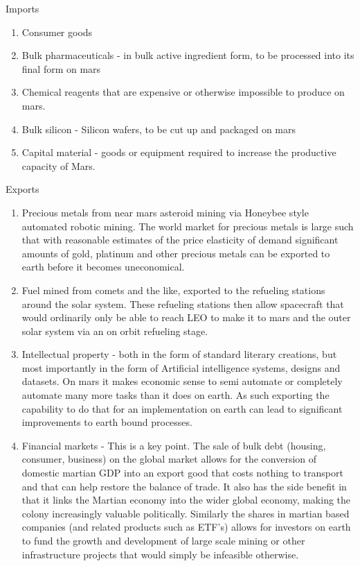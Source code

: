 \documentclass[10pt]{article}
\begin{document}
Imports
\begin{enumerate}
    \item Consumer goods
    \item Bulk pharmaceuticals - in bulk active ingredient form, to be processed into its final form on mars
    \item Chemical reagents that are expensive or otherwise impossible to produce on mars.
    \item Bulk silicon - Silicon wafers, to be cut up and packaged on mars
    \item Capital material  - goods or equipment required to increase the productive capacity of Mars.
\end{enumerate}

Exports
\begin{enumerate}
    \item Precious metals from near mars asteroid mining via Honeybee style automated robotic mining. The world market for precious metals is large such that with reasonable estimates of the price elasticity of demand significant amounts of gold, platinum and other precious metals can be exported to earth before it becomes uneconomical.
    \item Fuel mined from comets and the like, exported to the refueling stations around the solar system. These refueling stations then allow spacecraft that would ordinarily only be able to reach LEO to make it to mars and the outer solar system via an on orbit refueling stage.
    \item Intellectual property - both in the form of standard literary creations, but most importantly in the form of Artificial intelligence systems, designs and datasets. On mars it makes economic sense to semi automate or completely automate many more tasks than it does on earth. As such exporting the capability to do that for an implementation on earth can lead to significant improvements to earth bound processes.
    \item Financial markets - This is a key point. The sale of bulk debt (housing, consumer, business) on the global market allows for the conversion of domestic martian GDP into an export good that costs nothing to transport and that can help restore the balance of trade. It also has the side benefit in that it links the Martian economy into the wider global economy, making the colony increasingly valuable politically. Similarly the shares in martian based companies (and related products such as ETF's) allows for investors on earth to fund the growth and development of large scale mining or other infrastructure projects that would simply be infeasible otherwise. 

\end{enumerate}
\end{document}
